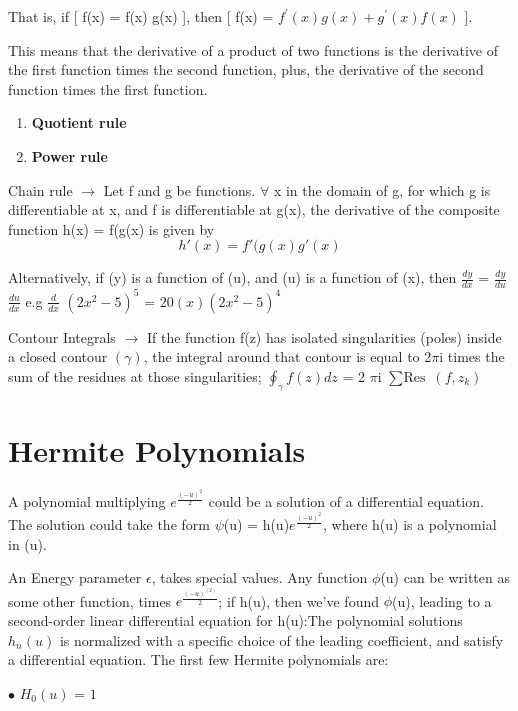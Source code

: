 \documentclass[a4paper, 10pt, onepage]{elegantbook}
\begin{document}
{That is, if [ f(x) = f(x) g(x) ], then [ f(x) = $f^{'}(x) g(x) + g^{'}(x) f(x)$ ].  

This means that the derivative of a product of two functions is the derivative of the first function times the second 
function, plus, the derivative of the second function times the first function.


\begin{enumerate}
\item \textbf{Quotient rule}
\item \textbf{Power rule}
\end{enumerate}

Chain rule $\rightarrow$ Let f and g be functions. $\forall$ x in the domain of g, for which g is differentiable at x, 
and f is differentiable at g(x), the derivative of the composite function h(x) = f(g(x) is given by
\begin{equation}
h'(x) = f'(g(x) g'(x)
\end{equation}

Alternatively, if (y) is a function of (u), and (u) is a function of (x), then $\frac{dy}{dx}$ = $\frac{dy}{du}$ 
$\frac{du}{dx}$ e.g $\frac{d}{dx}$ $(2x^2 - 5)^5$ = $20(x) (2x^2 - 5)^4$  

Contour Integrals $\rightarrow$ If the function f(z) has isolated singularities (poles) inside a closed contour 
$(\gamma)$, the integral around that contour is equal to
2$\pi$i times the sum of the residues at those singularities; $\oint _{\gamma} f(z) dz$ = 2 $\pi$i $\sum \text{Res}$ 
$(f,z_{k})$  

\section{Hermite Polynomials}

A polynomial multiplying $e^{\frac{(-u)^2}{2}}$ could be a solution of a differential equation. The solution could take 
the form $\psi$(u) = h(u)$e^{\frac{(-u)^2}{{2}}}$, where h(u) is a polynomial in (u). 

An Energy parameter $\epsilon$, takes special values. Any function $\phi$(u) can be written as some other function, 
times $e^{\frac{(-u)^(2)}{2}}$; if h(u), then we've found $\phi$(u), leading to a second-order linear differential 
equation for h(u):The polynomial solutions $h_n(u)$ is normalized with a specific choice of the
leading coefficient, and satisfy a differential equation. The first few Hermite polynomials are:  

$\bullet$ $H_0(u)$ = $1$  

}
\end{document}
